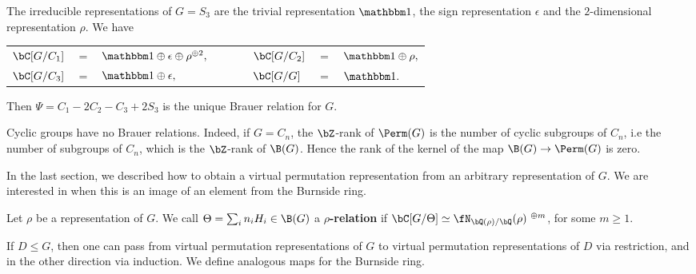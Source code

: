 \begin{example}
    The irreducible representations of $G = S_3$ are the trivial representation $\trivial$, the sign representation $\epsilon$ and the $2$-dimensional representation $\rho$.
    We have
    \begin{table}[H]
        \centering
    \begin{tabular}{l l l l l l l}
        $\bC[G / C_1]$ & $=$ & $\trivial \oplus \epsilon \oplus \rho^{\oplus 2},$ & $\qquad$ &
        $\bC[G / C_2]$ & $=$ & $\trivial \oplus \rho,$\\ 
        $\bC[G / C_3]$ & $=$ & $\trivial \oplus \epsilon,$ & $\qquad$ &
        $\bC[G / G]$ & $=$ & $\trivial.$  
    \end{tabular}
\end{table}
    Then $\Psi = C_1  - 2 C_2 - C_3 + 2S_3$ is the unique Brauer relation for $G$.
\end{example}

\begin{example}\label{cyclic-no-brauer}
Cyclic groups have no Brauer relations. Indeed, if $G = C_n$, the $\bZ$-rank of $\Perm(G)$ is the number of cyclic subgroups of $C_n$, i.e the number of subgroups of $C_n$, which is the $\bZ$-rank of $\B(G)$. Hence the rank of the kernel of the map $\B(G) \to \Perm(G)$ is zero.
\end{example}

In the last section, we described how to obtain a virtual permutation representation from an arbitrary representation of $G$. We are interested in when this is an image of an element from the Burnside ring.

\begin{defn}
Let $\rho$ be a representation of $G$.    
We call $\Theta = \sum_i n_i H_i \in \B(G)$ a \textbf{$\rho$-relation} if $\bC[G / \Theta] \simeq \repnorm{\rho}^{\ \oplus m}$, for some $m \geq 1$.
\end{defn}

If $D \leq G$, then one can pass from virtual permutation representations of $G$ to virtual permutation representations of $D$ via restriction, and in the other direction via induction. We define analogous maps for the Burnside ring.    

